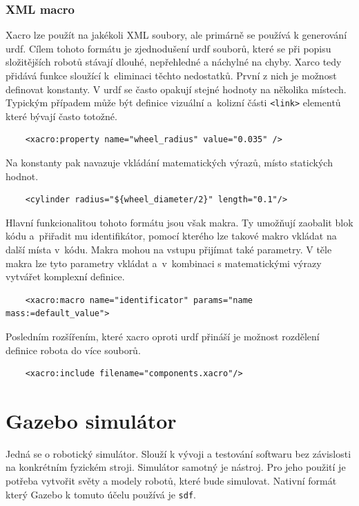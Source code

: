 \subsubsection*{XML macro}
Xacro lze použít na jakékoli XML soubory, ale primárně se používá k generování urdf. Cílem tohoto formátu je zjednodušení urdf souborů, které se při popisu složitějších robotů stávají dlouhé, nepřehledné a náchylné na chyby. Xarco tedy přidává funkce sloužící k~eliminaci těchto nedostatků. 
První z nich je možnost definovat konstanty. V urdf se často opakují stejné hodnoty na několika místech. Typickým případem může být definice vizuální a~kolizní části \verb|<link>| elementů které bývají často totožné. \cite{ros2_documentation} 
\begin{verbatim}
	<xacro:property name="wheel_radius" value="0.035" />
\end{verbatim}
Na konstanty pak navazuje vkládání matematických výrazů, místo statických hodnot.
\begin{verbatim}
	<cylinder radius="${wheel_diameter/2}" length="0.1"/>
\end{verbatim}
Hlavní funkcionalitou tohoto formátu jsou však makra. Ty umožňují zaobalit blok kódu a~přiřadit mu identifikátor, pomocí kterého lze takové makro vkládat na další místa v~kódu. 
Makra mohou na vstupu přijímat také parametry. V těle makra lze tyto parametry vkládat a~v~kombinaci s matematickými výrazy vytvářet komplexní definice.
\begin{verbatim}
	<xacro:macro name="identificator" params="name mass:=default_value">
\end{verbatim}
Posledním rozšířením, které xacro oproti urdf přináší je možnost rozdělení definice robota do více souborů.
\begin{verbatim}
	<xacro:include filename="components.xacro"/>
\end{verbatim} 

\section{Gazebo simulátor} \label{theory:gazebo}
Jedná se o robotický simulátor. Slouží k vývoji a testování softwaru bez závislosti na konkrétním fyzickém stroji. Simulátor samotný je nástroj. Pro jeho použití je potřeba vytvořit světy a modely robotů, které bude simulovat. Nativní formát který Gazebo k tomuto účelu používá je \verb|sdf|.

